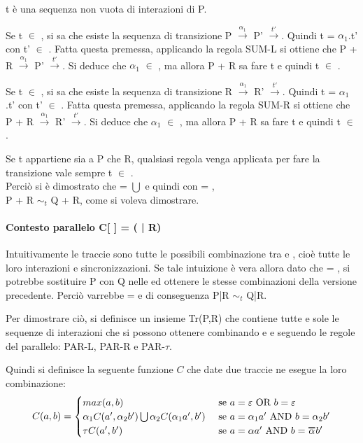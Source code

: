 t è una sequenza non vuota di interazioni di P.

Se t $\in$ , si sa che esiste la sequenza di transizione P $\overset{\alpha_{1}}\rightarrow$ P' $\overset{t'}\rightarrow$. Quindi t = $\alpha_{1}$.t' con t' $\in$ . Fatta questa premessa, applicando la regola SUM-L si ottiene che P + R $\overset{\alpha_{1}}\rightarrow$ P' $\overset{t'}\rightarrow$. Si deduce che $\alpha_{1}$ $\in$ , ma allora P + R sa fare t e quindi t $\in$ .

Se t $\in$ , si sa che esiste la sequenza di transizione R $\overset{\alpha_{1}}\rightarrow$ R' $\overset{t'}\rightarrow$. Quindi t = $\alpha_{1}$.t' con t' $\in$ . Fatta questa premessa, applicando la regola SUM-R si ottiene che P + R $\overset{\alpha_{1}}\rightarrow$ R' $\overset{t'}\rightarrow$. Si deduce che $\alpha_{1}$ $\in$ , ma allora P + R sa fare t e quindi t $\in$ .

Se t appartiene sia a P che R, qualsiasi regola venga applicata per fare la transizione vale sempre t $\in$ .\\

Perciò si è dimostrato che  =  $\bigcup$  e quindi con  = ,\\ P + R $\sim_{t}$ Q + R, come si voleva dimostrare.

\paragraph{Contesto parallelo  C[ ] = (\hspace{0.3cm} | R)} \mbox{}

Intuitivamente le traccie  sono tutte le possibili combinazione tra  e , cioè tutte le loro interazioni e sincronizzazioni. Se tale intuizione è vera allora dato che  = , si potrebbe sostituire P con Q nelle  ed ottenere le stesse combinazioni della versione precedente. Perciò varrebbe  =  e di conseguenza P|R $\sim_{t}$ Q|R.

Per dimostrare ciò, si definisce un insieme Tr(P,R) che contiene tutte e sole le sequenze di interazioni che si possono ottenere combinando  e  e seguendo le regole del parallelo: PAR-L, PAR-R e PAR-$\tau$.

Quindi si definisce la seguente funzione $C$ che date due traccie ne esegue la loro combinazione:
\[
	C(a,b) = 
	\begin{cases}
	max(a,b) &  $ se $ a = \varepsilon $ OR $ b = \varepsilon\\
	\alpha_{1}C(a', \alpha_{2}b')\bigcup\alpha_{2}C(\alpha_{1}a', b') & $ se $ a = \alpha_{1}a' $ AND $ b = \alpha_{2}b'\\
	\tau C(a',b') & $ se $ a = \alpha a' $ AND $ b = \Overline[1pt]{\alpha} b'\\
	\end{cases}
\]

